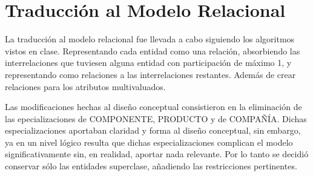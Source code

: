 \documentclass[]{report}
\begin{document}
	\chapter*{Traducción al Modelo Relacional}\large
	\newcommand{\key}[1]{\underline{#1}}
	\newcommand{\fkey}[2]{$\stackrel{\mathclap{\scriptsize\mbox{#2}}}{\overline{\overline{\mbox{#1}}}}$}
	\normalsize
	La traducción al modelo relacional fue llevada a cabo siguiendo los algoritmos vistos en clase. Representando cada entidad como una relación, absorbiendo las interrelaciones que tuviesen alguna entidad con participación de máximo 1, y representando como relaciones a las interrelaciones restantes. Además de crear relaciones para los atributos multivaluados. \par
	Las modificaciones hechas al diseño conceptual consistieron en la eliminación de las epecializaciones de COMPONENTE, PRODUCTO y de COMPAÑÍA. Dichas especializaciones aportaban claridad y forma al diseño conceptual, sin embargo, ya en un nivel lógico resulta que dichas especializaciones complican el modelo significativamente sin, en realidad, aportar nada relevante. Por lo tanto se decidió conservar sólo las entidades superclase, añadiendo las restricciones pertinentes.
	\vspace{0,2cm}
\end{document}
